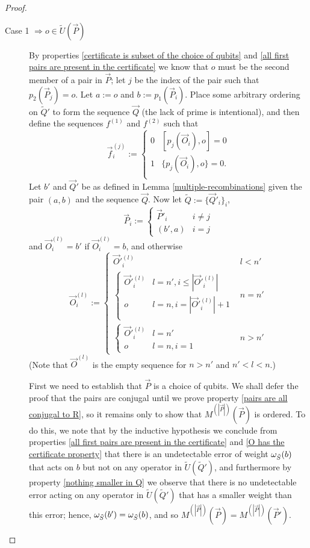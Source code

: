\documentclass[twocolumn,showpacs,preprintnumbers,amsmath,amssymb,nofootinbib,pra,floatfix]{revtex4-1}
\newcommand{\lst}{\vec}
\newcommand{\set}{\tilde}
\begin{document}
\begin{proof}
\begin{description}
\item[Case 1 $\Rightarrow o\in\set U(\lst P)$]
By properties \ref{certificate is subset of the choice of qubits} and \ref{all first pairs are present in the certificate} we know that $o$ must be the second member of a pair in $\lst P$;  let $j$ be the index of the pair such that $p_2(\lst P_j)=o$.  Let $a := o$ and $b := p_1(\lst P_i)$.  
Place some arbitrary ordering on $\set Q'$ to form the sequence $\lst Q$ (the lack of prime is intentional), and then define the sequences $f^{(1)}$ and $f^{(2)}$ such that
$$\lst f^{(j)}_i :=
\begin{cases}
0 & [p_j(\lst O_i),o] = 0 \\
1 & \{p_j(\lst O_i),o\} = 0. \\
\end{cases}
$$
Let $b'$ and $\lst Q'$ be as defined in Lemma \ref{multiple-recombinations} given the pair $(a,b)$ and the sequence $\lst Q$.  Now let $\set Q := \{\lst Q'_i\}_i$,
$$\lst P_i :=
\begin{cases}
\lst P'_i & i \ne j \\
(b',a) & i = j
\end{cases}
$$
and $\lst O^{(l)}_i=b'$ if $\lst O^{(l)}_i=b$, and otherwise 
$$
\lst O^{(l)}_i :=
\begin{cases}
\lst O'^{(l)}_i & l < n'\\
\begin{cases}
\lst O'^{(l)}_i & l = n', i \le |\lst O'^{(l)}_i|\\
o & l = n, i = |\lst O'^{(l)}_i|+1\\
\end{cases} & n = n' \\
\begin{cases}
\lst O'^{(l)}_i & l = n'\\
o & l = n, i = 1
\end{cases} & n > n'
\end{cases}
$$
(Note that $\lst O^{(l)}$ is the empty sequence for $n>n'$ and $n' < l < n$.)

First we need to establish that $\lst P$ is a choice of qubits.  We shall defer the proof that the pairs are conjugal until we prove property \ref{pairs are all conjugal to R}, so it remains only to show that $M^{(|\lst P|)}(\lst P)$ is ordered.  To do this, we note that by the inductive hypothesis we conclude from properties \ref{all first pairs are present in the certificate} and \ref{O has the certificate property} that there is an  undetectable error of weight $\om_{\set S}(b)$ that acts on $b$ but not on any operator in $\set U(\set Q')$, and furthermore by property \ref{nothing smaller in Q} we observe that there is no undetectable error acting on any operator in $\set U(\set Q')$ that has a smaller weight than this error;  hence, $\om_{\set S}(b')=\om_{\set S}(b)$, and so $M^{(|\lst P|)}(\lst P)=M^{(|\lst P|)}(\lst P')$.


\end{description}
\end{proof}
\end{document}
